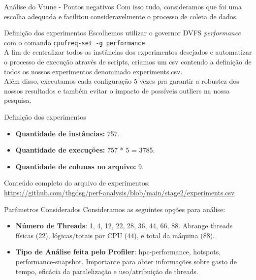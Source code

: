 \documentclass{beamer}
\begin{document}
\begin{frame}{Análise do Vtune - Pontos negativos}
    Com isso tudo, consideramos que foi uma escolha adequada e facilitou consideravelmente o processo de coleta de dados.
\end{frame}

\begin{frame}{Definição dos experimentos}
    Escolhemos utilizar o governor DVFS \textit{performance} com o comando \texttt{cpufreq-set -g performance}. \\
    \vspace{0.5em}
    A fim de centralizar todos as instâncias dos experimentos desejados e automatizar o processo de execução através de scripts, criamos um csv contendo a definição de todos os nossos experimentos denominado experiments.csv.\\
    \vspace{0.5em}
    Além disso, executamos cada configuração 5 vezes pra garantir a robustez dos nossos resultados e também evitar o impacto de possíveis outliers na nossa pesquisa.
    
\end{frame}
\begin{frame}{Definição dos experimentos}
    \begin{itemize}
        \item \textbf{Quantidade de instâncias:} 757.
        \item \textbf{Quantidade de execuções:} 757 * 5 = 3785.
         \item \textbf{Quantidade de colunas no arquivo:} 9.
    \end{itemize}
    \vspace{0.5em}
    Conteúdo completo do arquivo de experimentos: \\ \url{https://github.com/thgdsg/perf-analysis/blob/main/stage2/experiments.csv}
\end{frame}

\begin{frame}{Parâmetros Considerados}
    Consideramos as seguintes opções para análise:
    \begin{itemize}
        \item \textbf{Número de Threads}: {1, 4, 12, 22, 28, 36, 44, 66, 88}.
        Abrange threads físicas (22), lógicas/totais por CPU (44), e total da máquina (88).
        \item \textbf{Tipo de Análise feita pelo Profiler}: {hpc-performance, hotspots, performance-snapshot}.
        Importante para obter informações sobre gasto de tempo, eficácia da paralelização e uso/atribuição de threads.
    \end{itemize}
\end{frame}
\end{document}
